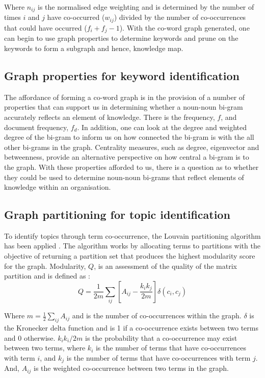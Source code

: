 \documentclass[a4paper, 11pt]{article}
\begin{document}
Where $n_{ij}$ is the normalised edge weighting and is determined by the number of times $i$ and $j$ have co-occurred ($w_{ij}$) divided by the number of co-occurrences that could have occurred ($f_i+f_j-1$).
With the co-word graph generated, one can begin to use graph properties to determine keywords and prune on the keywords to form a subgraph and hence, knowledge map.

\subsection{Graph properties for keyword identification}

The affordance of forming a co-word graph is in the provision of a number of properties that can support us in determining whether a noun-noun bi-gram accurately reflects an element of knowledge.
There is the frequency, $f$, and document frequency, $f_d$. In addition, one can look at the degree and weighted degree of the bi-gram to inform us on how connected the bi-gram is with the all other bi-grams in the graph.
Centrality measures, such as degree, eigenvector and betweenness, provide an alternative perspective on how central a bi-gram is to the graph. With these properties afforded to us, there is a question as to whether they could be used to determine noun-noun bi-grams that reflect elements of knowledge within an organisation.

\subsection{Graph partitioning for topic identification}\label{sec:topic}

To identify topics through term co-occurrence, the Louvain partitioning algorithm has been applied \parencite{blondel2008}.
The algorithm works by allocating terms to partitions with the objective of returning a partition set that produces the highest modularity score for the graph.
Modularity, $Q$, is an assessment of the quality of the matrix partition and is defined as \parencite{newman2004}:
\begin{equation}
  Q=\frac{1}{2m}\sum_{ij}\left[A_{ij}-\frac{k_ik_j}{2m}\right]\delta\left(c_i,c_j\right)
\end{equation}

Where $m=\frac{1}{2}\sum_{ij} A_{ij}$ and is the number of co-occurrences within the graph. $\delta$ is the Kronecker delta function and is 1 if a co-occurrence exists between two terms and 0 otherwise. 
$k_ik_i/2m$ is the probability that a co-occurrence may exist between two terms, where $k_i$ is the number of terms that have co-occurrences with term $i$, and $k_j$ is the number of terms that have co-occurrences with term $j$. 
And, $A_{ij}$ is the weighted co-occurrence between two terms in the graph.
\end{document}

